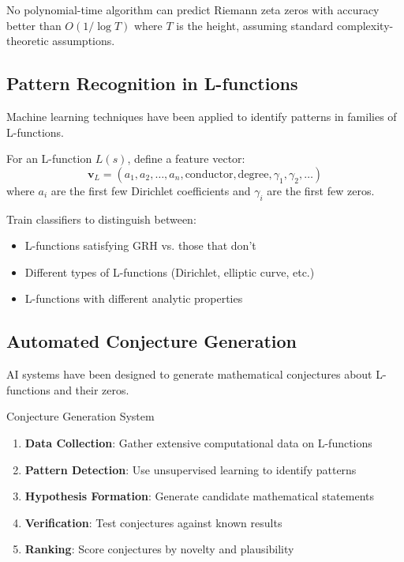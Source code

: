 \begin{theorem}
\label{thm:zero_prediction_limits}
No polynomial-time algorithm can predict Riemann zeta zeros with accuracy better than $O(1/\log T)$ where $T$ is the height, assuming standard complexity-theoretic assumptions.
\end{theorem}

\subsection{Pattern Recognition in L-functions}

Machine learning techniques have been applied to identify patterns in families of L-functions.

\begin{definition}
\label{def:l_function_features}
For an L-function $L(s)$, define a feature vector:
\begin{equation}
\mathbf{v}_L = (a_1, a_2, \ldots, a_n, \text{conductor}, \text{degree}, \gamma_1, \gamma_2, \ldots)
\label{eq:l_function_features}
\end{equation}
where $a_i$ are the first few Dirichlet coefficients and $\gamma_i$ are the first few zeros.
\end{definition}

\begin{experiment}
\label{exp:l_function_classification}
Train classifiers to distinguish between:
\begin{itemize}
\item L-functions satisfying GRH vs. those that don't
\item Different types of L-functions (Dirichlet, elliptic curve, etc.)
\item L-functions with different analytic properties
\end{itemize}
\end{experiment}

\subsection{Automated Conjecture Generation}

AI systems have been designed to generate mathematical conjectures about L-functions and their zeros.

\begin{algorithm}
\caption{Conjecture Generation System}
\label{alg:conjecture_generation}
\begin{enumerate}
\item \textbf{Data Collection}: Gather extensive computational data on L-functions
\item \textbf{Pattern Detection}: Use unsupervised learning to identify patterns
\item \textbf{Hypothesis Formation}: Generate candidate mathematical statements
\item \textbf{Verification}: Test conjectures against known results
\item \textbf{Ranking}: Score conjectures by novelty and plausibility
\end{enumerate}
\end{algorithm}

